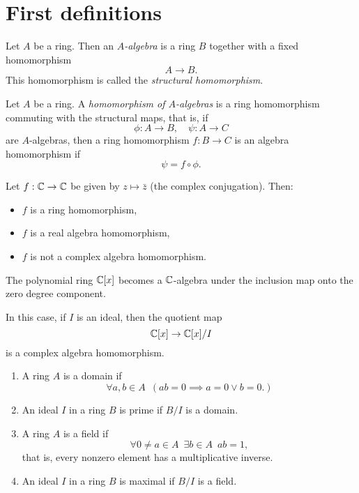 \section{First definitions}

\begin{df}
  Let $A$ be a ring. Then an \textit{$A$-algebra} is a ring $B$ together with a fixed homomorphism
  \[A \to B.\]
  This homomorphism is called the \textit{structural homomorphism}.
\end{df}

\begin{df}
  Let $A$ be a ring. A \textit{homomorphism of $A$-algebras} is a ring homomorphism commuting with the structural maps, that is, if
  \[ \phi: A \to B, \quad \psi: A \to C\]
  are $A$-algebras, then a ring homomorphism
  $f:B \to C$
  is an algebra homomorphism if
  \[\psi = f \circ \phi.\]
\end{df}

\begin{example}
  Let $f: \mathbb C \to \mathbb C$ be given by $z \mapsto \bar z$ (the complex conjugation). Then:
\begin{itemize}
\item \(f\) is a ring homomorphism,
\item \(f\) is a real algebra homomorphism,
\item \(f\) is not a complex algebra homomorphism.
\end{itemize}
\end{example}

\begin{example}
  The polynomial ring $\mathbb C [x]$ becomes a $\mathbb C$-algebra under the inclusion map onto the zero degree component.

  In this case, if $I$ is an ideal, then 
  the quotient map
  \[ \mathbb C[x] \to \mathbb C[x]/{I}\]
  is a complex algebra homomorphism.
\end{example}

\begin{df}
\mbox{}
\begin{enumerate}
\item A ring $A$ is a domain if
  \[\forall a,b \in A \enspace ( ab = 0 \implies a = 0 \lor b = 0. )\]
\item An ideal $I$ in a ring $B$ is prime if $B/{I}$ is a domain.
\item A ring $A$ is a field if
  \[\forall 0 \neq a \in A \enspace \exists b \in A \enspace ab = 1,\] that is, every nonzero element has a multiplicative inverse.
\item An ideal $I$ in a ring $B$ is maximal if $B/{I}$ is a field.
\end{enumerate}
\end{df}


